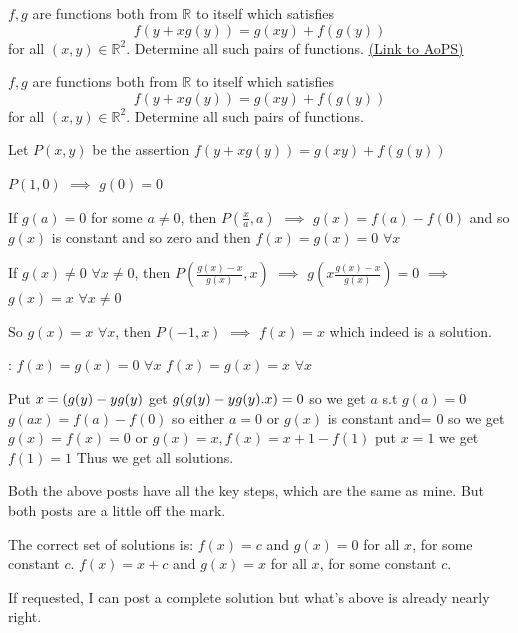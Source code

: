 \begin{problem}
	$f,g$ are functions both from $\mathbb{R}$ to itself which satisfies
\[f(y+xg(y))=g(xy)+f(g(y))\]
for all $(x,y)\in\mathbb{R}^2$. Determine all such pairs of functions.
	\flushright \href{https://artofproblemsolving.com/community/c6h484044}{(Link to AoPS)}
\end{problem}



\begin{solution}
	\begin{tcolorbox}$f,g$ are functions both from $\mathbb{R}$ to itself which satisfies
\[f(y+xg(y))=g(xy)+f(g(y))\]
for all $(x,y)\in\mathbb{R}^2$. Determine all such pairs of functions.\end{tcolorbox}
Let $P(x,y)$ be the assertion $f(y+xg(y))=g(xy)+f(g(y))$

$P(1,0)$ $\implies$ $g(0)=0$

If $g(a)=0$ for some $a\ne 0$, then $P(\frac xa,a)$ $\implies$ $g(x)=f(a)-f(0)$ and so $g(x)$ is constant and so zero and then $f(x)=g(x)=0$ $\forall x$

If $g(x)\ne 0$ $\forall x\ne 0$, then $P(\frac{g(x)-x}{g(x)},x)$ $\implies$ $g(x\frac{g(x)-x}{g(x)})=0$ $\implies$ $g(x)=x$ $\forall x\ne 0$

So $g(x)=x$ $\forall x$, then $P(-1,x)$ $\implies$ $f(x)=x$ which indeed is a solution.

 :
$f(x)=g(x)=0$ $\forall x$
$f(x)=g(x)=x$ $\forall x$
\end{solution}



\begin{solution}
	Put $x=(g(y)-y\/g(y)$
get $g(g(y)-y\/g(y).x)=0$
so we get $a$ s.t $g(a)=0$
$g(ax)=f(a)-f(0)$
so either $a=0$ or $g(x)$ is constant and= $0$
so we get $g(x)=f(x)=0$
or $g(x)=x,f(x)=x+1-f(1)$ put $x=1$ we get $f(1)=1$
Thus we get all solutions.
\end{solution}



\begin{solution}
	Both the above posts have all the key steps, which are the same as mine.
But both posts are a little off the mark.

The correct set of solutions is:
$f(x)=c$ and $g(x)=0$ for all $x$, for some constant $c$.
$f(x)=x+c$ and $g(x)=x$ for all $x$, for some constant $c$.

If requested, I can post a complete solution but what's above is already nearly right.
\end{solution}



